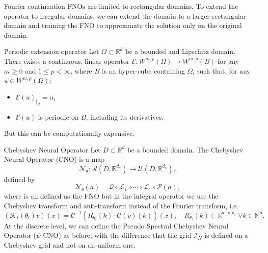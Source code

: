 \documentclass{beamer}
\newcommand{\numberset}{\mathbb}
\newcommand{\N}{\numberset{N}}
\newcommand{\R}{\numberset{R}}
\begin{document}
\begin{frame}{Fourier continuation}
	FNOs are limited to rectangular domains. To extend the operator to irregular domains, we can extend the domain to a larger rectangular domain and training the FNO to approximate the solution only on the original domain.
	\begin{themedTitleBlock}{Periodic extension operator}
		Let $\Omega \subset \R^d$ be a bounded and Lipschitz domain. There exists a continuous. linear operator $\mathcal{E}: W^{m,p}(\Omega) \to W^{m,p}(B)$ for any $m \ge 0$ and $1 \le p < \infty$, where $B$ is an hyper-cube containing $\Omega$, such that, for any $u \in W^{m,p}(\Omega)$:
		\begin{itemize}
			\item $\mathcal{E}(u)_{|_{\Omega}} = u$, 
			\item $\mathcal{E}(u)$ is periodic on $B$, including its derivatives.
		\end{itemize}
	\end{themedTitleBlock}
	\pause	
	But this can be computationally expensive.

\end{frame}



\begin{frame}{Chebyshev Neural Operator}
	Let $ D \subset \R^d $ be a bounded domain. The Chebyshev Neural Operator (CNO) is a map
	\[ \mathcal{N}_{\theta}: \mathcal{A}(D, \R^{d_a}) \to \mathcal{U}(D, \R^{d_u}), \]
	defined by
	\[ \mathcal{N}_{\theta}(a) = \mathcal{Q} \circ \mathcal{L}_L \circ \cdots \circ \mathcal{L}_1 \circ \mathcal{P}(a), \]
	where is all defined as the FNO but in the integral operator we use the Chebyshev transform and anti-transform instead of the Fourier transform, i.e.
	\[  (\mathcal{K}_t(\theta_t)v)(x)= \mathcal{C}^{-1}\left( R_{\theta_t}(k) \cdot \mathcal{C}(v)(k) \right)(x), \quad R_{\theta_t}(k) \in \R^{d_v \times d_v} \ \forall k \in \N^d. \]
	\pause 
	At the discrete level, we can define the Pseudo Spectral Chebyshev Neural Operator ($\psi$-CNO) as before, with the difference that the grid $ \mathcal{I}_N $ is defined on a Chebyshev grid and not on an uniform one.
\end{frame}

\end{document}

